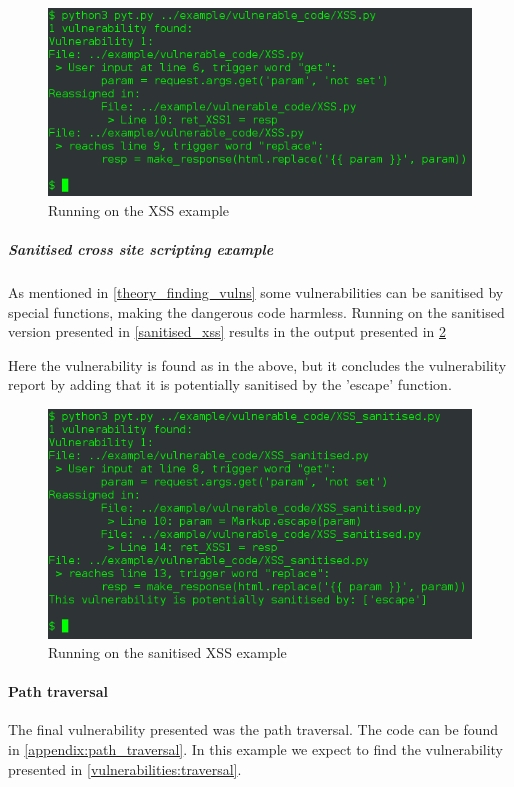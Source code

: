 \begin{figure}
  \includegraphics[width=\textwidth]{./figures/xss_console.png}
  \caption{Running \pyt{} on the XSS example}
  \label{xss:console}
\end{figure}

\subparagraph{Sanitised cross site scripting example}
As mentioned in \cref{theory_finding_vulns} some vulnerabilities can be sanitised by special functions, making the dangerous code harmless.
Running \pyt{} on the sanitised version presented in \cref{sanitised_xss} results in the output presented in \cref{xss_sanitised:console}

Here the vulnerability is found as in the above, but it concludes the vulnerability report by adding that it is potentially sanitised by the 'escape' function.

\begin{figure}
  \includegraphics[width=\textwidth]{./figures/xss_sanitised_console.png}
  \caption{Running \pyt{} on the sanitised XSS example}
  \label{xss_sanitised:console}
\end{figure}

\paragraph{Path traversal}
The final vulnerability presented was the path traversal.
The code can be found in \cref{appendix:path_traversal}.
In this example we expect to find the vulnerability presented in \cref{vulnerabilities:traversal}.

